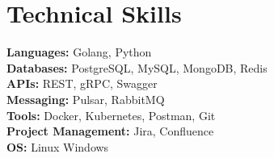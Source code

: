 

\section{Technical Skills}
\begin{itemize}[leftmargin=0.15in, label={}]
    \small{\item{
        \textbf{Languages:} Golang, Python \\[0.5ex]
        \textbf{Databases:} PostgreSQL, MySQL, MongoDB, Redis \\[0.5ex]
        \textbf{APIs:} REST, gRPC, Swagger \\[0.5ex]
        \textbf{Messaging:} Pulsar, RabbitMQ \\[0.5ex]
        \textbf{Tools:} Docker, Kubernetes, Postman, Git \\[0.5ex]
        \textbf{Project Management:} Jira, Confluence \\[0.5ex]
        \textbf{OS:} Linux Windows
    }}
\end{itemize}